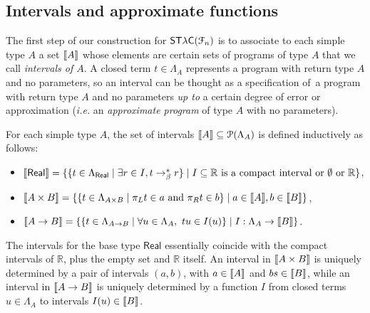 \subsection{Intervals and approximate functions}

The first step of our construction for $\mathsf{ST\lambda C}(\mathcal F_{n})$ is to associate to each simple type $A$ a set $\llbracket A \rrbracket$ whose elements are certain sets of programs of type $A$ that we call \emph{intervals of $A$}. 
A closed term $t\in \Lambda_{A}$ represents a program with return type $A$ and no parameters, so an interval can be thought as a specification of a program with return type $A$ and no parameters \emph{up to} a certain degree of error or approximation (\textit{i.e.} an \emph{approximate program} of type $A$ with no parameters). 


%
%
%




For each simple type $A$, the set of intervals $\llbracket A \rrbracket\subseteq \mathcal P(\Lambda_A)$ is defined inductively as follows:
\begin{itemize}
\item $\llbracket \mathsf{Real} \rrbracket = \{ \{ t \in \Lambda_\mathsf{Real} \mid \exists r \in I, t \to_\beta^* r \} \mid I \subseteq \mathbb{R} \text{ is a compact interval or $\emptyset$ or } \mathbb{R} \}$,
\item $\llbracket A \times B \rrbracket = \{ \{ t \in \Lambda_{A \times B} \mid \pi_L t \in a \text{ and } \pi_R t \in b \} \mid a  \in \llbracket A \rrbracket, b \in \llbracket B \rrbracket \}$,
\item $\llbracket A \to B \rrbracket = \{ \{ t \in \Lambda_{A \to B} \mid \forall u \in \Lambda_{A},~ tu \in I(u) \} \mid I : \Lambda_A \to \llbracket B \rrbracket \}$.
\end{itemize}

The intervals for the base type $\mathsf{Real}$ essentially coincide with the compact intervals of $\mathbb R$, plus the empty set and $\mathbb{R}$ itself. An interval in $\llbracket A\times B \rrbracket$ is uniquely determined by a pair of intervals $(a,b)$, with $a\in \llbracket A \rrbracket$ and $bs\in \llbracket B \rrbracket$, while an interval in $\llbracket A\to B \rrbracket$ is uniquely determined by a function 
$I$ from closed terms $u\in \Lambda_{ A}$ to intervals $I(u)\in \llbracket B \rrbracket$.

